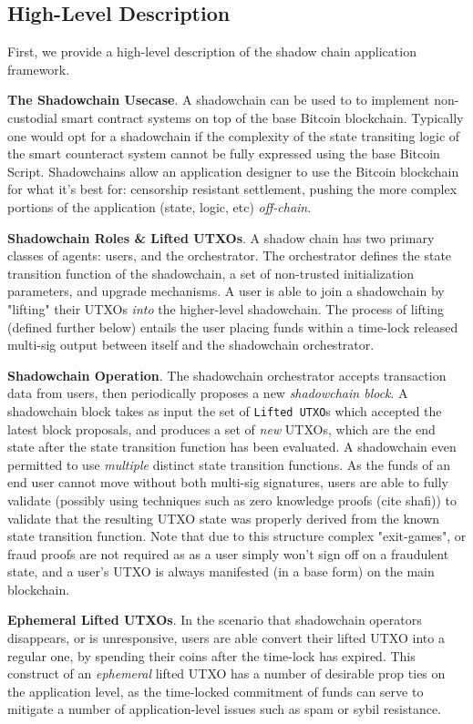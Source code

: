 \documentclass[12pt,a4paper]{article}
\theoremstyle{definition}
\begin{document}
\subsection{High-Level Description}

First, we provide a high-level description of the shadow chain application
framework. 

\textbf{The Shadowchain Usecase}. A shadowchain can be used to to implement
non-custodial smart contract systems on top of the base Bitcoin blockchain.
Typically one would opt for a shadowchain if the complexity of the state
transiting logic of the smart counteract system cannot be fully expressed using
the base Bitcoin Script.  Shadowchains allow an application designer to use the
Bitcoin blockchain for what it's best for: censorship resistant settlement,
pushing the more complex portions of the application (state, logic, etc)
\emph{off-chain}.

\textbf{Shadowchain Roles \& Lifted UTXOs}. A shadow chain has two primary
classes of agents: users, and the orchestrator.  The orchestrator defines the
state transition function of the shadowchain, a set of non-trusted
initialization parameters, and upgrade mechanisms. A user is able to join a
shadowchain by "lifting" their UTXOs \emph{into} the higher-level shadowchain.
The process of lifting (defined further below) entails the user placing funds
within a time-lock released multi-sig output between itself and the shadowchain
orchestrator. 

\textbf{Shadowchain Operation}. The shadowchain orchestrator accepts
transaction data from users, then periodically proposes a new \emph{shadowchain
block}. A shadowchain block takes as input the set of \texttt{Lifted UTXO}s
which accepted the latest block proposals, and produces a set of \emph{new}
UTXOs, which are the end state after the state transition function has been
evaluated. A shadowchain even permitted to use \emph{multiple} distinct state
transition functions. As the funds of an end user cannot move without both
multi-sig signatures, users are able to fully validate (possibly using
techniques such as zero knowledge proofs (cite shafi)) to validate that the
resulting UTXO state was properly derived from the known state transition
function.  Note that due to this structure complex "exit-games", or fraud
proofs are not required as as a user simply won't sign off on a fraudulent
state, and a user's UTXO is always manifested (in a base form) on the main
blockchain.

\textbf{Ephemeral Lifted UTXOs}. In the scenario that shadowchain operators
disappears, or is unresponsive, users are able convert their lifted UTXO into a
regular one, by spending their coins after the time-lock has expired. This
construct of an \emph{ephemeral} lifted UTXO has a number of desirable prop
ties on the application level, as the time-locked commitment of funds can serve
to mitigate a number of application-level issues such as spam or sybil
resistance.
\end{document}
